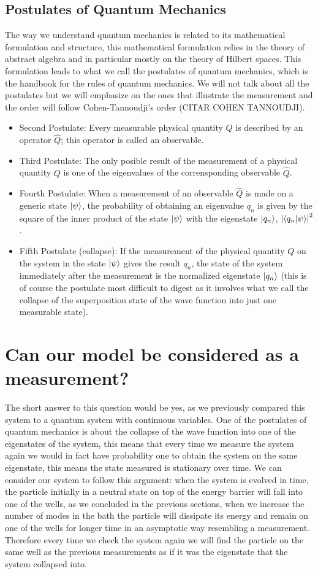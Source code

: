 \subsection{Postulates of Quantum Mechanics}
The way we understand quantum mechanics is related to its mathematical formulation and structure, this mathematical formulation relies in the theory of abstract algebra and in particular mostly on the theory of Hilbert spaces. This formulation leads to what we call the postulates of quantum mechanics, which is the handbook for the rules of quantum mechanics. We will not talk about all the postulates but we will emphasize on the ones that illustrate the measurement and the order will follow Cohen-Tannoudji’s order (CITAR COHEN TANNOUDJI).
\begin{itemize}
\item Second Postulate: Every measurable physical quantity $Q$ is described by an operator $\hat{Q}$; this operator is called an observable.
\item Third Postulate: The only posible result of the measurement of a physical quantity $Q$ is one of the eigenvalues of the corrensponding observable $\hat{Q}$.
\item  Fourth Postulate: When a measurement of an observable $\hat{Q}$ is made on a generic state $\ket{\psi}$, the probability of obtaining an eigenvalue $q_n$ is given by the square of the inner product of the state $\ket{\psi}$ with the eigenstate $\ket{q_n}$, $\abs{\bra{q_n} \ket{\psi}}^2$.
\item Fifth Postulate (collapse): If the measurement of the physical quantity $Q$ on the system in the state $\ket{\psi}$ gives the result $q_n$, the state of the system immediately after the measurement is the normalized eigenstate $\ket{q_n}$ (this is of course the postulate most difficult to digest as it involves what we call the collapse of the superposition state of the wave function into just one measurable state).
\end{itemize}



\section{Can our model be considered as a measurement?}
The short answer to this question would be yes, as we previously compared this system to a quantum system with continuous variables. One of the postulates of quantum mechanics is about the collapse of the wave function into one of the eigenstates of the system, this means that every time we measure the system again we would in fact have probability one to obtain the system on the same eigenstate, this means the state measured is stationary over time. We can consider our system to follow this argument: when the system is evolved in time, the particle initially in a neutral state on top of the energy barrier will fall into one of the wells, as we concluded in the previous sections, when we increase the number of modes in the bath the particle will dissipate its energy and remain on one of the wells for longer time in an asymptotic way resembling a measurement. Therefore every time we check the system again we will find the particle on the same well as the previous measurements as if it was the eigenstate that the system collapsed into.